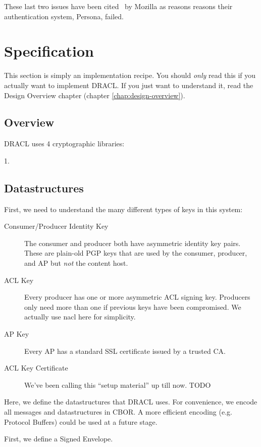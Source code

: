 \documentclass[pdftex,12pt,a4papaer,twoside,notitlepage]{report}
\begin{document}
These last two issues have been cited~\cite{persona-fail} by Mozilla as reasons
reasons their authentication system, Persona, failed.

\chapter{Specification}

This section is simply an implementation recipe. You should \emph{only} read
this if you actually want to implement DRACL. If you just want to understand it,
read the Design Overview chapter (chapter \ref{chap:design-overview}).

\section{Overview}

DRACL uses 4 cryptographic libraries:

1. 

\section{Datastructures}

First, we need to understand the many different types of keys in this system:

\begin{description}
\item[Consumer/Producer Identity Key] The consumer and producer both have
  asymmetric identity key pairs. These are plain-old PGP keys that are used by
  the consumer, producer, and AP but \emph{not} the content host.
\item[ACL Key] Every producer has one or more asymmetric ACL signing key.
  Producers only need more than one if previous keys have been compromised. We
  actually use nacl here for simplicity. %
\item[AP Key] Every AP has a standard SSL certificate issued by a trusted CA.
\item[ACL Key Certificate] We've been calling this ``setup material'' up till
  now. TODO
\end{description}

Here, we define the datastructures that DRACL uses. For convenience, we encode
all messages and datastructures in CBOR. A more efficient encoding (e.g.
Protocol Buffers) could be used at a future stage.

First, we define a Signed Envelope.
\end{document}
